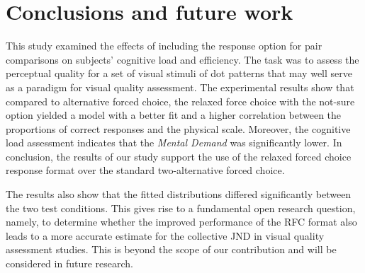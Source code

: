 \documentclass[a4paper,conference]{IEEEtran}
\begin{document}
\section{Conclusions and future work}
This study examined the effects of including the  response option for pair comparisons on subjects' cognitive load and efficiency. The task was to assess the perceptual quality for a set of visual stimuli of dot patterns that may well serve as a paradigm for visual quality assessment. The experimental results show that compared to alternative forced choice, the relaxed force choice with the not-sure option yielded a model with a better fit and a higher correlation between the proportions of correct responses and the physical scale. Moreover, the cognitive load assessment indicates that the \textit{Mental Demand} was significantly lower. In conclusion, the results of our study  support the use of the relaxed forced choice response format over the standard two-alternative forced choice. 

The results also show that the fitted distributions differed significantly between the two test conditions. This gives rise to a fundamental open research question, namely, to determine whether the improved performance of the RFC format also leads to a more accurate estimate for the collective JND in visual quality assessment studies. This is beyond the scope of our contribution and will be considered in future research. 




\end{document}
